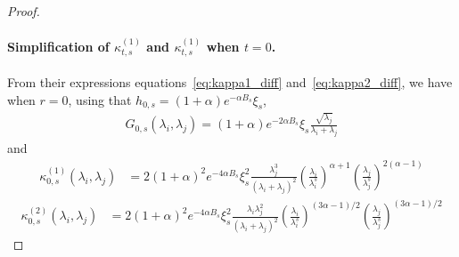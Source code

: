 \documentclass[11pt]{article}
\begin{document}
\begin{proof}
\paragraph{Simplification of $\kappa^{(1)}_{t, s}$ and $ \kappa^{(1)}_{t, s}$ when $t=0$.}
From their expressions equations~\eqref{eq:kappa1_diff} and~\eqref{eq:kappa2_diff}, we have when $r=0$, using that $h_{0,s} = (1+\alpha) e^{-\alpha B_s} \xi_s$, 
\begin{align*}
    G_{0,s}(\lambda_i, \lambda_j) = (1+\alpha) e^{-2\alpha B_s} \xi_s \frac{\sqrt{\lambda_j}}{ \lambda_i  + \lambda_j }
\end{align*}
and
\begin{align} \label{eq:kappa1_diff_simp}
\kappa^{(1)}_{0,s}(\lambda_i,\lambda_j) &=  2 (1+\alpha)^2 e^{-4 \alpha B_s} \xi_s^2 \frac{\lambda_j^3}{ (\lambda_i  + \lambda_j)^2 } \left(\frac{\lambda_i}{\lambda^s_i}\right)^{\alpha+1}  \left(\frac{\lambda_j}{\lambda^s_j}\right)^{2(\alpha-1)}
\end{align}
\begin{equation} \label{eq:kappa2_diff_simp}
\begin{split}
    \kappa^{(2)}_{0,s}(\lambda_i,\lambda_j) &= 2 (1+\alpha)^2 e^{-4 \alpha B_s} \xi_s^2 \frac{\lambda_i \lambda_j^2}{ (\lambda_i  + \lambda_j)^2 } \left(\frac{\lambda_i}{\lambda^s_i}\right)^{(3\alpha-1)/2} \left(\frac{\lambda_j}{\lambda^s_j}\right)^{(3\alpha-1)/2}  %
\end{split}
\end{equation}


\end{proof}
\end{document}
